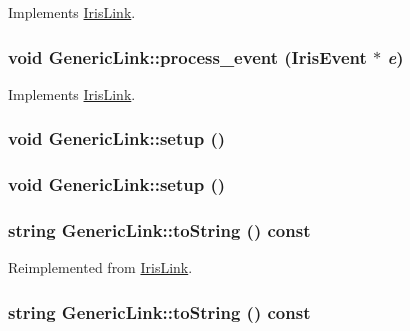 Implements \hyperlink{classIrisLink_9c5494bc5716aedf3affe748f3a542c1}{IrisLink}.\hypertarget{classGenericLink_c09533f8445eb3c550c744fd4ada7324}{
\subsubsection[{process\_\-event}]{\setlength{\rightskip}{0pt plus 5cm}void GenericLink::process\_\-event ({\bf IrisEvent} $\ast$ {\em e})}}
\label{classGenericLink_c09533f8445eb3c550c744fd4ada7324}




Implements \hyperlink{classIrisLink_9c5494bc5716aedf3affe748f3a542c1}{IrisLink}.\hypertarget{classGenericLink_8afec492b9c0a403462c2cf1001adc77}{
\subsubsection[{setup}]{\setlength{\rightskip}{0pt plus 5cm}void GenericLink::setup ()}}
\label{classGenericLink_8afec492b9c0a403462c2cf1001adc77}


\hypertarget{classGenericLink_8afec492b9c0a403462c2cf1001adc77}{
\subsubsection[{setup}]{\setlength{\rightskip}{0pt plus 5cm}void GenericLink::setup ()}}
\label{classGenericLink_8afec492b9c0a403462c2cf1001adc77}


\hypertarget{classGenericLink_64dad2c98848fb48b3b572887031167b}{
\subsubsection[{toString}]{\setlength{\rightskip}{0pt plus 5cm}string GenericLink::toString () const}}
\label{classGenericLink_64dad2c98848fb48b3b572887031167b}




Reimplemented from \hyperlink{classIrisLink_d25db1c98385d7abd82180e5746813a6}{IrisLink}.\hypertarget{classGenericLink_64dad2c98848fb48b3b572887031167b}{
\subsubsection[{toString}]{\setlength{\rightskip}{0pt plus 5cm}string GenericLink::toString () const}}
\label{classGenericLink_64dad2c98848fb48b3b572887031167b}




